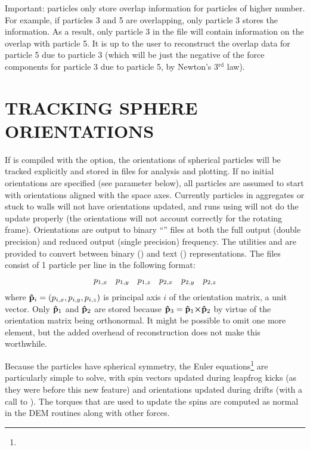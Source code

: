 Important: particles only store overlap information for particles of
higher  number.  For example, if particles 3 and 5 are
overlapping, only particle 3 stores the information.  As a result,
only particle 3 in the  file will contain information
on the overlap with particle 5.  It is up to the user to reconstruct
the overlap data for particle 5 due to particle 3 (which will be just
the negative of the force components for particle 3 due to particle 5,
by Newton's 3$^{\mathrm{rd}}$ law).

\section{TRACKING SPHERE ORIENTATIONS}

If  is compiled with the 
option, the orientations of spherical particles will be tracked
explicitly and stored in files for analysis and plotting.  If no
initial orientations are specified (see  parameter
below), all particles are assumed to start with orientations aligned
with the space axes.  Currently particles in aggregates or stuck to
walls will not have orientations updated, and runs using
 will not do the update properly (\ie the
orientations will not account correctly for the rotating frame).
Orientations are output to binary ``'' files at both the
full output (double precision) and reduced output (single precision)
frequency.  The utilities  and  are
provided to convert between binary () and text
() representations.  The  files consist of 1
particle per line in the following format:
\begin{displaymath}
  \centering
  \begin{array}{llllll}
    p_{1,x} & p_{1,y} & p_{1,z} & p_{2,x} & p_{2,y} & p_{2,z}
  \end{array}
\end{displaymath}
where $\mathbf{\hat{p}}_i = (p_{i,x},p_{i,y},p_{i,z})$ is principal axis $i$
of the orientation matrix, a unit vector.  Only $\mathbf{\hat{p}}_1$ and
$\mathbf{\hat{p}}_2$ are stored because $\mathbf{\hat{p}}_3 = \mathbf{\hat{p}}_1 \mbox{\boldmath $\times$}
\mathbf{\hat{p}}_2$ by virtue of the orientation matrix being orthonormal.  It
might be possible to omit one more element, but the added overhead of
reconstruction does not make this worthwhile.

Because the particles have spherical symmetry, the Euler
equations\footnote{}
are particularly simple to solve, with spin vectors updated during
leapfrog kicks (as they were before this new feature) and orientations
updated during drifts (with a call to ).
The torques that are used to update the spins are computed as normal
in the DEM routines along with other forces.


